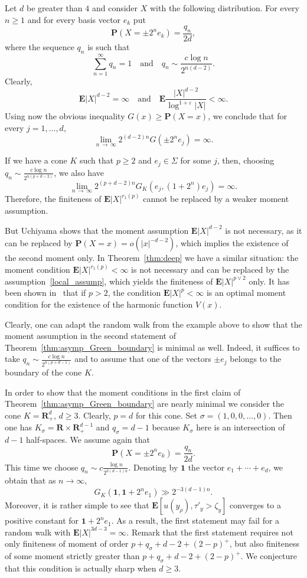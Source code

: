 \documentclass[AHL,Unicode,longabstracts,published]{cedram}
\newcommand{\pr}{\mathbf{P}}
\newcommand{\e}{\mathbf{E}}
\newcommand{\bfR}{\mathbf{R}}
\newcommand{\ind}{\mathbf{1}}
\renewcommand{\ge}{\geqslant}
\renewcommand{\geq}{\geqslant}
\begin{document}
Let $d$ be greater than $4$ and consider $X$ with the following distribution. For every $n\ge1$ and for every basis vector $e_k$ put
\[
\pr\left(X=\pm 2^n e_k\right)=\frac{q_n}{2d},
\]
where the sequence $q_n$ is such that
\[
\sum_{n=1}^\infty q_n=1\quad\text{and}\quad q_n\sim \frac{c\log n}{2^{n(d-2)}}.
\]
Clearly,
\[
\e|X|^{d-2}=\infty\quad\text{and}\quad
\e\frac{|X|^{d-2}}{\log^{1+\varepsilon}|X|}<\infty.
\]
Using now the obvious inequality $G(x)\ge\pr(X=x)$, we conclude that for every $j=1,\ldots,d$,
\[
\lim_{n\,\to\,\infty}2^{(d-2)n}G\left(\pm 2^n e_j\right)=\infty.
\]

If we have a cone $K$ such that $p\ge2$ and $e_j\in\Sigma$ for some $j$, then, choosing $q_n\sim\frac{c\log n}{2^{n(p+d-2)}}$, we also have
\[
\lim_{n\,\to\,\infty}2^{(p+d-2)n}G_{K}\left(e_j,(1+2^n)e_j\right)=\infty.
\]
Therefore, the finiteness of $\e| X|^{r_1(p)}$ cannot be replaced by a weaker moment assumption.



But Uchiyama shows that the moment assumption $\e| X|^{d-2}$ is not necessary, as it can be replaced by $\pr(X=x)=o(| x|^{-d-2})$, which implies the existence of the second moment only. In Theorem~\ref{thm:deep} we have a similar situation: the moment condition $\e| X|^{r_1(p)}<\infty$ is not necessary and can be replaced by the assumption~\eqref{local_assump}, which yields the finiteness of $\e| X|^{p\vee2}$ only. It has been shown in~\cite{DeWa-15} that if $p>2$, the condition $\e| X|^{p}<\infty$ is an optimal moment condition for the existence of the harmonic function $V(x)$.

Clearly, one can adapt the random walk from the example above to show that the moment assumption in the second statement of Theorem~\ref{thm:asymp_Green_boundary} is minimal as well. Indeed, it suffices to take $q_n\sim\frac{c\log n}{2^{n(p+d-1)}}$ and to assume that one of the vectors $\pm e_j$ belongs to the boundary of the cone $K$.

In order to show that the moment conditions in the first claim of Theorem~\ref{thm:asymp_Green_boundary} are nearly minimal we consider the cone $K=\bfR_+^d$, $d\ge3$. Clearly, $p=d$ for this cone. Set $\sigma=(1,0,0,\ldots,0)$. Then one has $K_\sigma=\bfR\times\bfR_+^{d-1}$ and $q_\sigma=d-1$ because $K_{\sigma}$ here is an intersection of $d-1$ half-spaces. We assume again that
\[
\pr\left(X=\pm 2^ne_k\right)=\frac{q_n}{2d}.
\]
This time we choose $q_n\sim c\frac{\log n}{2^{3(d-1)n}}$. Denoting by $\ind$ the vector $e_1+\cdots +e_d$, we obtain that as $n\to\infty$,
\[
G_K\left(\ind,\ind+2^ne_1\right)\gg 2^{-3(d-1)n}.
\]
Moreover, it is rather simple to see that $\e[u(y_{\rho}),\tau'_{y}>\zeta_{y}]$ converges to a positive constant for $\ind+2^ne_1$. As a result, the first statement may fail for a random walk with $\e| X|^{3d-3}=\infty$. Remark that the first statement requires not only finiteness of moment of order $p+q_{\sigma}+d-2+(2-p)^+$, but also finiteness of some moment strictly greater than $p+q_{\sigma}+d-2+(2-p)^+$. We conjecture that this condition is actually sharp when $d\geq 3$.
\end{document}
